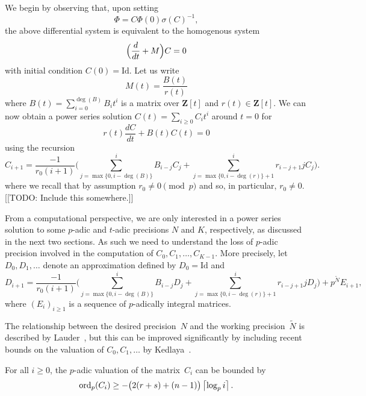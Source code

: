 We begin by observing that, upon setting 
\begin{equation}
\Phi = C \Phi(0) \sigma(C)^{-1},
\end{equation}
the above differential system is equivalent to the homogenous system 
\begin{equation} \label{eq:de}
\Bigl(\frac{d}{dt} + M\Bigr) C = 0
\end{equation}
with initial condition $C(0) = \text{Id}$.  Let us write 
\begin{equation}
M(t) = \frac{B(t)}{r(t)}
\end{equation}
where $B(t) = \sum_{i=0}^{\deg(B)} B_i t^i$ is a matrix over $\mathbf{Z}[t]$ 
and $r(t) \in \mathbf{Z}[t]$.  We can now obtain a power series solution 
$C(t) = \sum_{i \geq 0} C_i t^i$ around $t=0$ for 
\begin{equation}
r(t) \frac{dC}{dt} + B(t) C(t) = 0
\end{equation}
using the recursion 
\begin{equation}
C_{i+1} = \frac{-1}{r_0 (i+1)} \biggl(
    \sum_{j=\max{\{0,i-\deg(B)\}}}^i B_{i-j} C_j + 
    \sum_{j=\max{\{0,i-\deg(r)\}}+1}^i r_{i-j+1} j C_j \biggr).
\end{equation}
where we recall that by assumption $r_0 \neq 0 \pmod{p}$ and so, 
in particular, $r_0 \neq 0$.  [[TODO:  Include this somewhere.]]

From a computational perspective, we are only interested in a power 
series solution to some $p$-adic and $t$-adic precisions $N$ and $K$, 
respectively, as discussed in the next two sections.  As such we need 
to understand the loss of $p$-adic precision involved in the computation 
of $C_0, C_1, \dotsc, C_{K-1}$.  More precisely, let $D_0, D_1, \dotsc$ 
denote an approximation defined by $D_0 = \text{Id}$ and 
\begin{equation}
D_{i+1} = \frac{-1}{r_0 (i+1)} \biggl(
    \sum_{j=\max{\{0,i-\deg(B)\}}}^i B_{i-j} D_j + 
    \sum_{j=\max{\{0,i-\deg(r)\}}+1}^i r_{i-j+1} j D_j \biggr) + 
    p^{\tilde{N}} E_{i+1},
\end{equation}
where $(E_i)_{i \geq 1}$ is a sequence of $p$-adically integral matrices. 

The relationship between the desired precision~$N$ and the working 
precision~$\tilde{N}$ is described by Lauder~\citep[Theorem~5.1]{Lauder2006}, 
but this can be improved significantly by including recent bounds on the 
valuation of $C_0, C_1, \dotsc$ by Kedlaya~\citep{Kedlaya2010}.

\begin{thm} \label{thm:valC}
For all $i \geq 0$, the $p$-adic valuation of the matrix~$C_i$ 
can be bounded by 
\begin{equation}
\operatorname{ord}_p(C_i) \geq - \bigl(2 (r + s) + (n - 1)\bigr) \left\lceil\log_p i\right\rceil.
\end{equation}
\end{thm}

